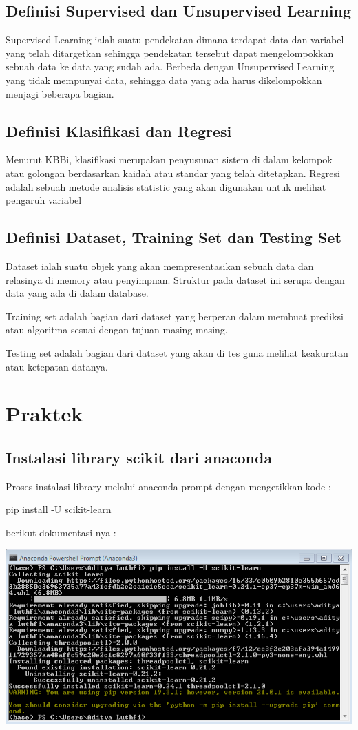 \documentclass{article}
\begin{document}
\subsection{Definisi Supervised dan Unsupervised Learning}
Supervised Learning ialah suatu pendekatan  dimana terdapat data dan variabel yang telah ditargetkan sehingga pendekatan tersebut dapat mengelompokkan sebuah data ke data yang sudah ada. Berbeda dengan Unsupervised Learning yang tidak mempunyai data, sehingga data yang ada harus dikelompokkan menjagi beberapa bagian.

\subsection{Definisi Klasifikasi dan Regresi}
Menurut KBBi, klasifikasi merupakan penyusunan sistem di dalam kelompok atau golongan berdasarkan kaidah atau standar yang telah ditetapkan. 
Regresi adalah sebuah metode analisis statistic yang akan digunakan untuk melihat pengaruh variabel

\subsection{Definisi Dataset, Training Set dan Testing Set}
Dataset ialah suatu objek yang akan mempresentasikan sebuah data dan relasinya di memory atau penyimpnan. Struktur pada dataset ini serupa dengan data yang ada di dalam database. 

Training set adalah bagian dari dataset yang berperan dalam membuat prediksi atau algoritma sesuai dengan tujuan masing-masing.

Testing set adalah bagian dari dataset yang akan di tes guna melihat keakuratan atau ketepatan datanya.

\section{Praktek}
\subsection{Instalasi library scikit dari anaconda}
Proses instalasi library melalui anaconda prompt dengan mengetikkan kode : 
\item pip install -U scikit-learn
\item berikut dokumentasi nya :

\begin{center}
    \includegraphics[width=.8\textwidth]{figures/1184090/chapter1/1.PNG}
\end{center}
\end{document}
